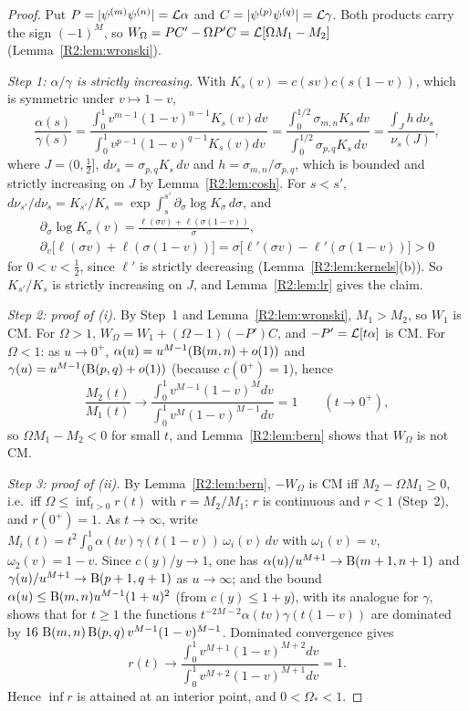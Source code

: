 \documentclass[11pt]{amsart}
\theoremstyle{definition}
\theoremstyle{remark}
\begin{document}
\begin{proof}
Put $P=|\psi^{(m)}\psi^{(n)}|=\mathcal{L}\alpha$ and
$C=|\psi^{(p)}\psi^{(q)}|=\mathcal{L}\gamma$. Both products carry the sign
$(-1)^M$, so $W_\Omega=PC'-\Omega P'C=\mathcal{L}[\Omega M_1-M_2]$
(Lemma~\ref{R2:lem:wronski}).

\emph{Step 1: $\alpha/\gamma$ is strictly increasing.} With
$K_s(v)=c(sv)c(s(1-v))$, which is symmetric under $v\mapsto1-v$,
\[
 \frac{\alpha(s)}{\gamma(s)}
 =\frac{\int_0^1v^{m-1}(1-v)^{n-1}K_s(v)dv}{\int_0^1v^{p-1}(1-v)^{q-1}K_s(v)dv}
 =\frac{\int_0^{1/2}\sigma_{m,n}K_s\,dv}{\int_0^{1/2}\sigma_{p,q}K_s\,dv}
 =\frac{\int_J h\,d\nu_s}{\nu_s(J)},
\]
where $J=(0,\frac12]$, $d\nu_s=\sigma_{p,q}K_s\,dv$ and
$h=\sigma_{m,n}/\sigma_{p,q}$, which is bounded and strictly increasing on
$J$ by Lemma~\ref{R2:lem:cosh}. For $s<s'$,
$d\nu_{s'}/d\nu_s=K_{s'}/K_s=\exp\int_s^{s'}\partial_\sigma\log K_\sigma\,d\sigma$, and
\begin{gather*}
 \partial_\sigma\log K_\sigma(v)=\frac{\ell(\sigma v)+\ell(\sigma(1-v))}{\sigma},\\
 \partial_v\bigl[\ell(\sigma v)+\ell(\sigma(1-v))\bigr]=\sigma\bigl[\ell'(\sigma v)-\ell'(\sigma(1-v))\bigr]>0
\end{gather*}
for $0<v<\frac12$, since $\ell'$ is strictly decreasing
(Lemma~\ref{R2:lem:kernels}(b)). So $K_{s'}/K_s$ is strictly increasing on
$J$, and Lemma~\ref{R2:lem:lr} gives the claim.

\emph{Step 2: proof of (i).} By Step~1 and Lemma~\ref{R2:lem:wronski},
$M_1>M_2$, so $W_1$ is CM. For $\Omega>1$, $W_\Omega=W_1+(\Omega-1)(-P')C$,
and $-P'=\mathcal{L}[t\alpha]$ is CM. For $\Omega<1$: as $u\to0^+$,
$\alpha(u)=u^{M-1}(\operatorname{B}(m,n)+o(1))$ and
$\gamma(u)=u^{M-1}(\operatorname{B}(p,q)+o(1))$ (because $c(0^+)=1$), hence
\[
 \frac{M_2(t)}{M_1(t)}\to\frac{\int_0^1v^{M-1}(1-v)^{M}dv}{\int_0^1v^{M}(1-v)^{M-1}dv}=1
 \qquad(t\to0^+),
\]
so $\Omega M_1-M_2<0$ for small $t$, and Lemma~\ref{R2:lem:bern} shows that
$W_\Omega$ is not CM.

\emph{Step 3: proof of (ii).} By Lemma~\ref{R2:lem:bern}, $-W_\Omega$ is CM
iff $M_2-\Omega M_1\ge0$, i.e.\ iff $\Omega\le\inf_{t>0}r(t)$ with
$r=M_2/M_1$; $r$ is continuous and $r<1$ (Step~2), and $r(0^+)=1$. As
$t\to\infty$, write $M_i(t)=t^2\int_0^1\alpha(tv)\gamma(t(1-v))\,\omega_i(v)\,dv$
with $\omega_1(v)=v$, $\omega_2(v)=1-v$. Since $c(y)/y\to1$, one has
$\alpha(u)/u^{M+1}\to\operatorname{B}(m+1,n+1)$ and $\gamma(u)/u^{M+1}\to\operatorname{B}(p+1,q+1)$
as $u\to\infty$; and the bound $\alpha(u)\le\operatorname{B}(m,n)u^{M-1}(1+u)^2$ (from
$c(y)\le1+y$), with its analogue for $\gamma$, shows that for $t\ge1$ the
functions $t^{-2M-2}\alpha(tv)\gamma(t(1-v))$ are dominated by
$16\,\operatorname{B}(m,n)\operatorname{B}(p,q)\,v^{M-1}(1-v)^{M-1}$. Dominated convergence gives
\[
 r(t)\to\frac{\int_0^1v^{M+1}(1-v)^{M+2}dv}{\int_0^1v^{M+2}(1-v)^{M+1}dv}=1 .
\]
Hence $\inf r$ is attained at an interior point, and $0<\Omega_*<1$.
\end{proof}
\end{document}
